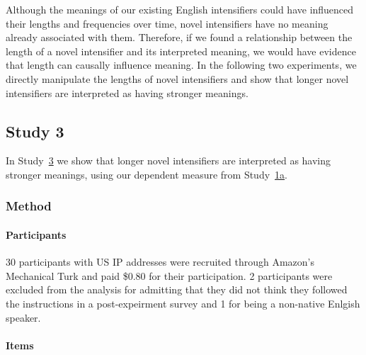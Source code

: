 \documentclass[10pt,letterpaper]{article}
\begin{document}
Although the meanings of our existing English intensifiers could have influenced their lengths and frequencies over time, novel intensifiers have no meaning already associated with them. Therefore, if we found a relationship between the length of a novel intensifier and its interpreted meaning, we would have evidence that length can causally influence meaning. In the following two experiments, we directly manipulate the lengths of novel intensifiers and show that longer novel intensifiers are interpreted as having stronger meanings.

\subsection{Study 3 \label{sec:study3}}


In Study~\hyperref[sec:study3]{3} we show that longer novel intensifiers are interpreted as having stronger meanings, using our dependent measure from Study~\hyperref[sec:study1a]{1a}.

\subsubsection{Method}

\paragraph{Participants}

30 participants with US IP addresses were recruited through Amazon's Mechanical Turk and paid \$0.80 for their participation. 2 participants were excluded from the analysis for admitting that they did not think they followed the instructions in a post-expeirment survey and 1 for being a non-native Enlgish speaker.

\paragraph{Items}
\end{document}
